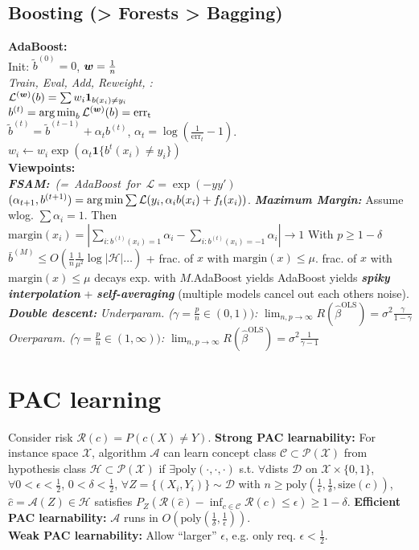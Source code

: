 \subsection*{Boosting (> Forests > Bagging)}
\textbf{AdaBoost:}\\
Init: $\tilde{b}^{(0)}=0$, ${\bm{w}}=\frac{1}{n}$\\
\emph{Train, Eval, Add, Reweight, {\tiny\CircArrowRight{}}:}\\
$\mathcal{L}^{({\bm{w}})}(b)=\sum w_i\mathbf{1}_{b(x_i)\neq y_i}$\\
$b^{(t)} = \operatorname*{arg\,min}_b \mathcal{L}^{({\bm{w}})}(b) = \mathrm{err_t}$\\
$\tilde{b}^{(t)} = \tilde{b}^{(t-1)} + \alpha_t b^{(t)}$, $\alpha_t = \log(\frac{1}{\mathrm{err}_t}-1)$.\\
$w_i \leftarrow w_i\exp(\alpha_t\mathbf{1}\{b^{t}(x_i) \neq y_i\})$\\
\textbf{Viewpoints:}\\
\mbox{\emph{\textbf{FSAM:}} \emph{(= AdaBoost for $\mathcal{L}=\exp(-yy')$}}
$(\alpha_{t+1}, b^{(t+1)}) = \operatorname*{arg\,min}\sum\mathcal{L}(y_i, \alpha_i b(x_i) + f_t(x_i))$.
\emph{\textbf{Maximum Margin:}} Assume wlog. $\sum \alpha_i = 1$. Then $\mathrm{margin}(x_i)=|\sum_{i:b^{(t)}(x_i)=1}\alpha_i - \sum_{i:b^{(t)}(x_i)=-1}\alpha_i| \to 1$
With $p\geq 1-\delta$ $\bar{b}^{(M)} \leq O(\frac{1}{n}\frac{1}{\mu^2}\log|\mathcal{H}|\ldots)$ + frac. of $x$ with $\mathrm{margin}(x) \leq \mu$. frac. of $x$ with $\mathrm{margin}(x) \leq \mu$ decays exp. with $M$.AdaBoost yields AdaBoost yields 
\emph{\textbf{spiky interpolation}} + \emph{\textbf{self-averaging}} (multiple models cancel out each others noise). \emph{\textbf{Double descent:}} \emph{Underparam. ($\gamma = \frac{p}{n}\in(0,1))$:} $\lim_{n,p\to\infty} R(\hat{\beta}^{\mathrm{OLS}}) = \sigma^2\frac{\gamma}{1-\gamma}$ \emph{Overparam. ($\gamma = \frac{p}{n}\in(1,\infty))$:} $\lim_{n,p\to\infty} R(\hat{\beta}^{\mathrm{OLS}}) = \sigma^2\frac{1}{\gamma-1}$ 

\section*{PAC learning}
Consider risk $\mathcal{R}(c) = P(c(X)\neq Y)$.
\textbf{Strong PAC learnability:}
For instance space $\mathcal{X}$, algorithm $\mathcal{A}$ can learn concept class
$\mathcal{C}\subset\mathcal{P}(\mathcal{X})$ from hypothesis class $\mathcal{H}\subset\mathcal{P}(\mathcal{X})$ if $\exists\mathrm{poly}(\cdot,\cdot,\cdot)$ s.t.
$\forall$dists $\mathcal{D}$ on $\mathcal{X}\times\{0,1\}$, $\forall 0<\epsilon<\frac{1}{2}$, $0<\delta<\frac{1}{2}$, $\forall Z=\{(X_i,Y_i)\}\sim\mathcal{D}$ with $n\geq\mathrm{poly}(\frac{1}{\epsilon},\frac{1}{\delta},\mathrm{size}(c))$, $\hat{c} = \mathcal{A}(Z)\in\mathcal{H}$ satisfies $P_Z(\mathcal{R}(\hat{c})-\inf_{c\in\mathcal{C}}\mathcal{R}(c)\leq\epsilon) \geq 1-\delta$.
\textbf{Efficient PAC learnability:} $\mathcal{A}$ runs in $O(\mathrm{poly}(\frac{1}{\delta},\frac{1}{\epsilon}))$.\\
\textbf{Weak PAC learnability:} Allow ``larger'' $\epsilon$, e.g. only req. $\epsilon < \frac{1}{2}$.


